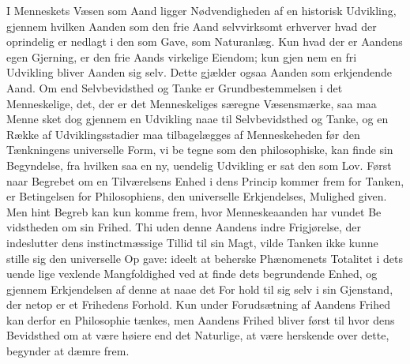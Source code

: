\documentclass[12pt,a4paper]{book}
\begin{document}
I Menneskets Væsen som Aand ligger Nødvendigheden af
en historisk Udvikling, gjennem hvilken Aanden som den frie
Aand selvvirksomt erhverver hvad der oprindelig er nedlagt i
den som Gave, som Naturanlæg. Kun hvad der er Aandens
egen Gjerning, er den frie Aands virkelige Eiendom; kun gjen\-%
nem en fri Udvikling bliver Aanden sig selv. Dette gjælder
ogsaa Aanden som erkjendende Aand. Om end Selvbevidsthed
og Tanke er Grundbestemmelsen i det Menneskelige, det, der
er det Menneskeliges særegne Væsensmærke, saa maa Menne\-%
sket dog gjennem en Udvikling naae til Selvbevidsthed og
Tanke, og en Række af Udviklingsstadier maa tilbagelægges af
Menneskeheden før den Tænkningens universelle Form, vi be\-%
tegne som den philosophiske, kan finde sin Begyndelse, fra
hvilken saa en ny, uendelig Udvikling er sat den som Lov.
Først naar Begrebet om en Tilværelsens Enhed i dens Princip
kommer frem for Tanken, er Betingelsen for Philosophiens,
den universelle Erkjendelses, Mulighed given. Men hint Begreb
kan kun komme frem, hvor Menneskeaanden har vundet Be\-%
vidstheden om sin Frihed. Thi uden denne Aandens indre
Frigjørelse, der indeslutter dens instinctmæssige Tillid til sin
Magt, vilde Tanken ikke kunne stille sig den universelle Op\-%
gave: ideelt at beherske Phænomenets Totalitet i dets uende\-%
lige vexlende Mangfoldighed ved at finde dets begrundende
Enhed, og gjennem Erkjendelsen af denne at naae det For\-%
hold til sig selv i sin Gjenstand, der netop er et Frihedens
Forhold. Kun under Forudsætning af Aandens Frihed kan
derfor en Philosophie tænkes, men Aandens Frihed bliver først
til hvor dens Bevidsthed om at være høiere end det Naturlige,
at være herskende over dette, begynder at dæmre frem.
\end{document}
